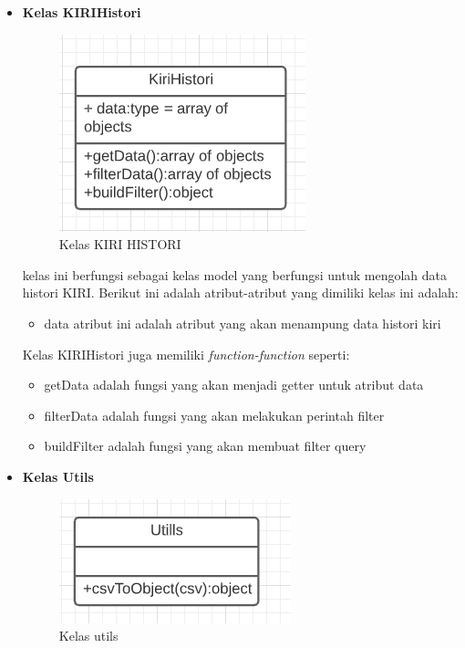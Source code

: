 \begin{itemize}
    \item \textbf{Kelas KIRIHistori}
    \begin{figure}[H]
        	\centering  
        	\includegraphics[scale=1]{Gambar/KIRI-Histori-Class.PNG}  
        	\caption[Kelas KIRI HISTORI]{Kelas KIRI HISTORI} 
        	\label{fig:KIRIHistoriClass} 
    \end{figure}
    kelas ini berfungsi sebagai kelas model yang berfungsi untuk mengolah data histori KIRI. Berikut ini adalah atribut-atribut yang dimiliki kelas ini adalah:
    \begin{itemize}
        \item data  atribut ini adalah atribut yang akan menampung data histori kiri
    \end{itemize}
    Kelas KIRIHistori juga memiliki \textit{function-function} seperti:
    \begin{itemize}
        \item getData adalah fungsi yang akan menjadi getter untuk atribut data
        \item filterData adalah fungsi yang akan melakukan perintah filter 
        \item buildFilter adalah fungsi yang akan membuat filter query
    \end{itemize}
    \item \textbf{Kelas Utils}
    \begin{figure}[H]
        	\centering  
        	\includegraphics[scale=1]{Gambar/Utils-Class.PNG}  
        	\caption[Kelas Utils]{Kelas utils} 
        	\label{fig:utilsClass} 

\end{figure}
\end{itemize}
